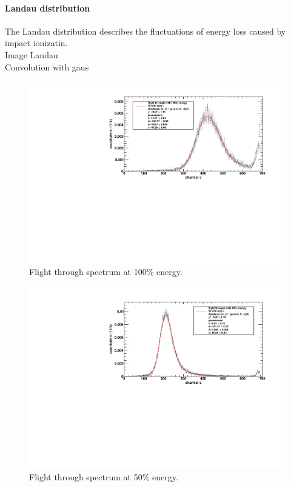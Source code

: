 \paragraph{Landau distribution}
The Landau distribution describes the fluctuations of energy loss caused by impact ionizatin. \\
Image Landau \\
Convolution with gaus
\begin{figure}[H]
\begin{center}
  \includegraphics[width=\textwidth]{../img/energiekalibration_100.pdf}
  \caption{Flight through spectrum at 100$\%$ energy.}
  \label{img:label}
\end{center}
\end{figure}

\begin{figure}[H]
\begin{center}
  \includegraphics[width=\textwidth]{../img/energiekalibration_50.pdf}
  \caption{Flight through spectrum at 50$\%$ energy.}
  \label{img:label}
\end{center}
\end{figure}

